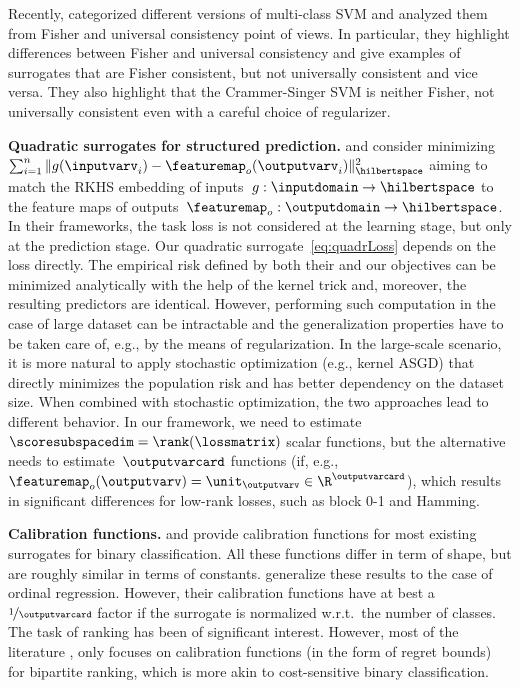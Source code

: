 \documentclass{article}
\begin{document}
%
%

Recently, \citet{dogan2016svm} categorized different versions of multi-class SVM and analyzed them from Fisher and universal consistency point of views.
In particular, they highlight differences between Fisher and universal consistency and give examples of surrogates that are Fisher consistent, but not universally consistent and vice versa.
They also highlight that the Crammer-Singer SVM is neither Fisher, not universally consistent even with a careful choice of regularizer.

\textbf{Quadratic surrogates for structured prediction.}
\citet{ciliberto16} and \citet{brouard2016input} consider minimizing~$\sum_{i=1}^n \|g(\inputvarv_i) - \featuremap_o(\outputvarv_i)\|_\hilbertspace^2$ aiming to match the RKHS embedding of inputs~$g: \inputdomain \to  \hilbertspace$ to the feature maps of outputs~$\featuremap_o: \outputdomain \to \hilbertspace$.
In their frameworks, the task loss is not considered at the learning stage, but only at the prediction stage.
Our quadratic surrogate~\eqref{eq:quadrLoss} depends on the loss directly.
The empirical risk defined by both their and our objectives can be minimized analytically with the help of the kernel trick and, moreover, the resulting predictors are identical.
However, performing such computation in the case of large dataset can be intractable and the generalization properties have to be taken care of, e.g., by the means of regularization.
In the large-scale scenario, it is more natural to apply stochastic optimization (e.g., kernel ASGD) that directly minimizes the population risk and has better dependency on the dataset size.
When combined with stochastic optimization, the two approaches lead to different behavior.
In our framework, we need to estimate~$\scoresubspacedim = \rank(\lossmatrix)$ scalar functions, but the alternative needs to estimate~$\outputvarcard$ functions (if, e.g., $\featuremap_o(\outputvarv) = \unit_\outputvarv \in \R^\outputvarcard$), which results in significant differences for low-rank losses, such as block 0-1 and Hamming.

\textbf{Calibration functions.}
\citet{bartlett06convexity} and \citet{steinwart07} provide calibration functions for most existing surrogates for binary classification.
All these functions differ in term of shape, but are roughly similar in terms of constants.
\citet{pedregosa15ordivalreg} generalize these results to the case of ordinal regression.
However, their calibration functions have at best a $\nicefrac{1}{\outputvarcard}$ factor if the surrogate is normalized w.r.t.\ the number of classes.
The task of ranking has been of significant interest.
However, most of the literature \citep[e.g.,][]{clemencon2008ranking,cossock2008ranking,kotlowski2011bipartite,agarwal2014regretbounds},
only focuses on calibration functions (in the form of regret bounds) for bipartite ranking, which is more akin to cost-sensitive binary classification.
\end{document}
